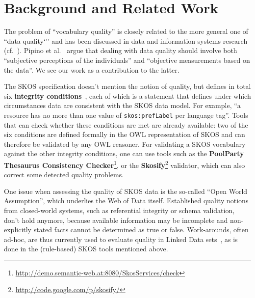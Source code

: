 
\section{Background and Related Work}\label{sec:background}

The problem of ``vocabulary quality'' is closely related to the more general one of ``data quality`'' and has been discussed in data and information systems research (cf.~\cite{Batini2009}). Pipino et al.~\cite{Pipino2002} argue that dealing with data quality should involve both ``subjective perceptions of the individuals'' and ``objective measurements based on the data''. We see our work as a contribution to the latter.

The SKOS specification doesn't mention the notion of quality, but defines in total six \textbf{integrity conditions}~\cite{SkosReference2008}, each of which is a statement that defines under which circumstances data are consistent with the SKOS data model. For example, ``a resource has no more than one value of \texttt{skos:prefLabel} per language tag''. Tools that can check whether these conditions are met are already available: two of the six conditions are defined formally in the OWL representation of SKOS and can therefore be validated by any OWL reasoner. For validating a SKOS vocabulary against the other integrity conditions, one can use tools such as the \textbf{PoolParty Thesaurus Consistency Checker}\footnote{\url{http://demo.semantic-web.at:8080/SkosServices/check}}, or the \textbf{Skosify}\footnote{\url{http://code.google.com/p/skosify/}} validator, which can also correct some detected quality problems.

One issue when assessing the quality of SKOS data is the so-called ``Open World Assumption'', which underlies the Web of Data itself. Established quality notions from closed-world systems, such as referential integrity or schema validation, don't hold anymore, because available information may be incomplete and non-explicitly stated facts cannot be determined as true or false.  Work-arounds, often ad-hoc, are thus currently used to evaluate quality in Linked Data sets~\cite{Heath2011}, as is done in the (rule-based) SKOS tools mentioned above.



